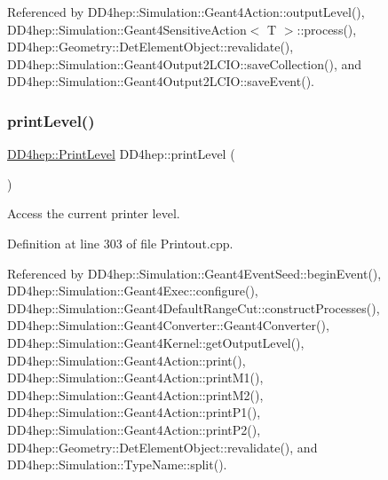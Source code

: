 Referenced by D\+D4hep\+::\+Simulation\+::\+Geant4\+Action\+::output\+Level(), D\+D4hep\+::\+Simulation\+::\+Geant4\+Sensitive\+Action$<$ T $>$\+::process(), D\+D4hep\+::\+Geometry\+::\+Det\+Element\+Object\+::revalidate(), D\+D4hep\+::\+Simulation\+::\+Geant4\+Output2\+L\+C\+I\+O\+::save\+Collection(), and D\+D4hep\+::\+Simulation\+::\+Geant4\+Output2\+L\+C\+I\+O\+::save\+Event().

\hypertarget{namespace_d_d4hep_abdbd705fe59353c8596e4ad5b7355814}{}\label{namespace_d_d4hep_abdbd705fe59353c8596e4ad5b7355814} 
\subsubsection{\texorpdfstring{print\+Level()}{printLevel()}}
{\footnotesize\ttfamily \hyperlink{namespace_d_d4hep_a5b5a64d56252469451f2020a27d57d42}{D\+D4hep\+::\+Print\+Level} D\+D4hep\+::print\+Level (\begin{DoxyParamCaption}{ }\end{DoxyParamCaption})}



Access the current printer level. 



Definition at line 303 of file Printout.\+cpp.



Referenced by D\+D4hep\+::\+Simulation\+::\+Geant4\+Event\+Seed\+::begin\+Event(), D\+D4hep\+::\+Simulation\+::\+Geant4\+Exec\+::configure(), D\+D4hep\+::\+Simulation\+::\+Geant4\+Default\+Range\+Cut\+::construct\+Processes(), D\+D4hep\+::\+Simulation\+::\+Geant4\+Converter\+::\+Geant4\+Converter(), D\+D4hep\+::\+Simulation\+::\+Geant4\+Kernel\+::get\+Output\+Level(), D\+D4hep\+::\+Simulation\+::\+Geant4\+Action\+::print(), D\+D4hep\+::\+Simulation\+::\+Geant4\+Action\+::print\+M1(), D\+D4hep\+::\+Simulation\+::\+Geant4\+Action\+::print\+M2(), D\+D4hep\+::\+Simulation\+::\+Geant4\+Action\+::print\+P1(), D\+D4hep\+::\+Simulation\+::\+Geant4\+Action\+::print\+P2(), D\+D4hep\+::\+Geometry\+::\+Det\+Element\+Object\+::revalidate(), and D\+D4hep\+::\+Simulation\+::\+Type\+Name\+::split().

\hypertarget{namespace_d_d4hep_a6d434af620a49074f3d86d05a04b6073}{}\label{namespace_d_d4hep_a6d434af620a49074f3d86d05a04b6073} 

